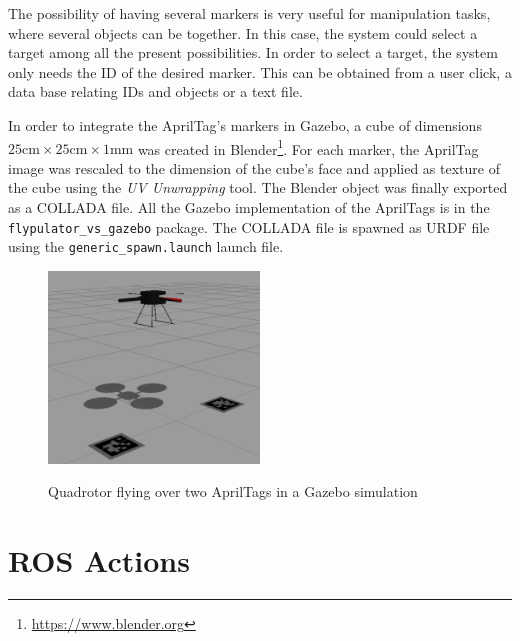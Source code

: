 The possibility of having several markers is very useful for manipulation tasks, where several objects can be together. In this case, the system could select a target among all the present possibilities. In order to select a target, the system only needs the ID of the desired marker. This can be obtained from a user click, a data base relating IDs and objects or a text file.

 In order to integrate the AprilTag's markers in Gazebo, a cube of dimensions $25\text{cm}\times25\text{cm}\times1\text{mm}$ was created in Blender\footnote{\url{https://www.blender.org}}. For each marker, the AprilTag image was rescaled to the dimension of the cube's face and applied as texture of the cube using the \emph{UV Unwrapping} tool. The Blender object was finally exported as a COLLADA file. All the Gazebo implementation of the AprilTags is in the \texttt{flypulator\_vs\_gazebo} package. The COLLADA file is spawned as URDF file using the \texttt{generic\_spawn.launch} launch file.

\begin{figure}[!htb]
	\caption{Quadrotor flying over two AprilTags in a Gazebo simulation}
	\centering
	\includegraphics[width=0.5\textwidth]{content/chapter_05/images/fly2tags.png}
	\label{fig:fly2tags}
\end{figure}



\section{ROS Actions}
\label{sec:ros_actions}
